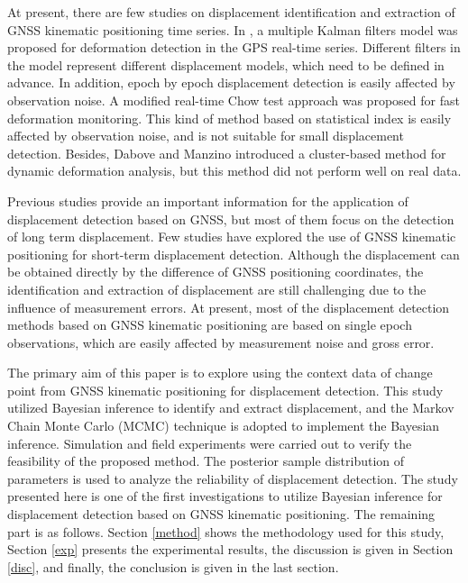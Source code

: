 \documentclass[journal]{IEEEtran}
\begin{document}
	At present, there are few studies on displacement identification and extraction of GNSS kinematic positioning time series. In \cite{li2010deformation}, a multiple Kalman filters model was proposed for deformation detection in the GPS real-time series. Different filters in the model represent different displacement models, which need to be defined in advance. In addition, epoch by epoch displacement detection is easily affected by observation noise.
	A modified real-time Chow test approach was proposed for fast deformation monitoring\cite{bellone2016real}. This kind of method based on statistical index is easily affected by observation noise, and is not suitable for small displacement detection\cite{pirotti2015micro}. Besides, Dabove and Manzino\cite{dabove2016fast} introduced a cluster-based method for dynamic deformation analysis, but this method did not perform well on real data.
	
	Previous studies provide an important information for the application of displacement detection based on GNSS, but most of them focus on the detection of long term displacement. 
	Few studies have explored the use of GNSS kinematic positioning for short-term displacement detection. 
	Although the displacement can be obtained directly by the difference of GNSS positioning coordinates, the identification and extraction of displacement are still challenging due to the influence of measurement errors.
	At present, most of the displacement detection methods based on GNSS kinematic positioning are based on single epoch observations, which are easily affected by measurement noise and gross error.
	
	The primary aim of this paper is to explore using the context data of change point from GNSS kinematic positioning for displacement detection. 
	This study utilized Bayesian inference to identify and extract displacement, and the Markov Chain Monte Carlo (MCMC) technique is adopted to implement the Bayesian inference. 
	Simulation and field experiments were carried out to verify the feasibility of the proposed method. 
	The posterior sample distribution of parameters is used to analyze the reliability of displacement detection. 
	The study presented here is one of the first investigations to utilize Bayesian inference for displacement detection based on GNSS kinematic positioning. 
	The remaining part is as follows. Section \ref{method} shows the methodology used for this study, Section \ref{exp} presents the experimental results, the discussion is given in Section \ref{disc}, and finally, the conclusion is given in the last section.
	
\end{document}
